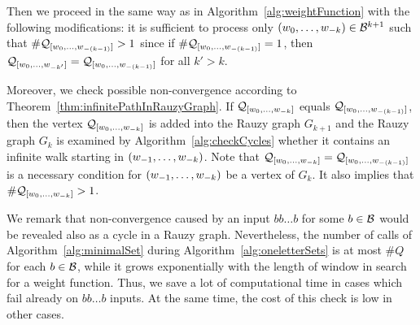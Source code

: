 Then we proceed in the same way as in Algorithm~\ref{alg:weightFunction} with the following modifications: it is sufficient to process only $(w_{0}, \dots, w_{-k}) \in \mathcal{B}^{k+1}$ such that $\#\mathcal{Q}_{[w_{0}, \dots, w_{-(k-1)}]}>1$ since if $\#\mathcal{Q}_{[w_{0}, \dots, w_{-(k-1)}]}=1$, then $\mathcal{Q}_{[w_{0}, \dots, w_{-k'}]}=\mathcal{Q}_{[w_{0}, \dots, w_{-(k-1)}]}$ for all $k'>k$. 

Moreover, we check possible non-convergence according to Theorem~\ref{thm:infinitePathInRauzyGraph}. If $\mathcal{Q}_{[w_{0}, \dots, w_{-k}]}$ equals $\mathcal{Q}_{[w_{0}, \dots, w_{-(k-1)}]}$, then the vertex $\mathcal{Q}_{[w_{0}, \dots, w_{-k}]}$ is added into the Rauzy graph $G_{k+1}$ and the Rauzy graph $G_k$ is examined by Algorithm~\ref{alg:checkCycles} whether it contains an infinite walk starting in $(w_{-1}, \dots, w_{-k})$. Note that $\mathcal{Q}_{[w_{0}, \dots, w_{-k}]} = \mathcal{Q}_{[w_{0}, \dots, w_{-(k-1)}]}$ is a necessary condition for $(w_{-1}, \dots, w_{-k})$ be a vertex of $G_k$. It also implies that $\#\mathcal{Q}_{[w_{0}, \dots, w_{-k}]}>1$.

We remark that  non-convergence caused by an input $bb\dots b$ for some $b\in\mathcal{B}$ would be revealed also as a cycle in a Rauzy graph. Nevertheless, the number of calls of Algorithm~\ref{alg:minimalSet} during Algorithm~\ref{alg:oneletterSets} is at most $\#Q$ for each $b\in\mathcal{B}$, while it grows exponentially with the length of window in search for a weight function. Thus, we save a lot of computational time in cases which fail already on $bb\dots b$ inputs. At the same time, the cost of this check is low in other cases.







